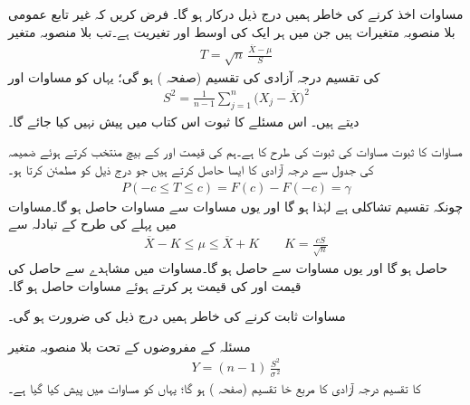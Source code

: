 مساوات  اخذ کرنے کی خاطر ہمیں درج ذیل درکار ہو گا۔
\quad
فرض کریں کہ  غیر تابع عمومی بلا منصوبہ متغیرات ہیں جن میں ہر ایک کی اوسط  اور تغیریت  ہے۔تب بلا منصوبہ متغیر
\begin{align}
T=\sqrt{n}\,\frac{\overline{X}-\mu}{S}
\end{align}
کی تقسیم  درجہ آزادی کی  تقسیم (صفحہ ) ہو گی؛ یہاں  کو مساوات 
 اور
\begin{align}\label{مساوات_شماریات_مسئلہ_مربع_ایس}
S^2=\frac{1}{n-1}\sum_{j=1}^{n} \big(X_j-\overline{X}\big)^2
\end{align}
دیتے ہیں۔ اس مسئلے کا ثبوت اس کتاب میں پیش نہیں کیا جائے گا۔

مساوات  کا ثبوت مساوات  کی ثبوت کی طرح کا ہے۔ہم  کی قیمت  اور  کے بیچ  منتخب کرتے ہوئے  ضمیمہ  کی جدول  سے  درجہ آزادی کا  ایسا  حاصل کرتے ہیں جو درج ذیل کو مطمئن کرتا ہو۔
\begin{align}\label{مساوات_شماریات_ٹی_تقسیم_ثبوت_الف}
P(-c\le T\le c)=F(c)-F(-c)=\gamma
\end{align}
چونکہ  تقسیم تشاکلی ہے لہٰذا  ہو گا اور یوں مساوات   سے مساوات  حاصل ہو گا۔مساوات  میں پہلے کی طرح  کے تبادلہ سے
\begin{align}\label{مساوات_شماریات_ٹی_تقسیم_ثبوت_ب}
\overline{X}-K\le \mu\le \overline{X}+K\quad\quad K=\frac{cS}{\sqrt{n}}
\end{align}
حاصل ہو گا اور یوں مساوات  سے  حاصل ہو گا۔مساوات  میں مشاہدے سے  حاصل  کی قیمت  اور  کی قیمت  پر کرتے ہوئے مساوات  حاصل ہو گا۔

مساوات  ثابت کرنے کی خاطر ہمیں درج ذیل کی ضرورت ہو گی۔

\quad
مسئلہ  کے مفروضوں کے تحت بلا منصوبہ متغیر
\begin{align}\label{مساوات_شماریات_مسئلہ_وائے}
Y=(n-1)\,\frac{S^2}{\sigma^{\,2}}
\end{align}
کا تقسیم   درجہ آزادی کا مربع خا تقسیم (صفحہ ) ہو گا؛ یہاں  کو مساوات  میں پیش کیا گیا ہے۔

